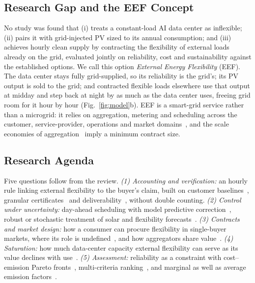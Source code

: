 \documentclass[conference]{IEEEtran}
\begin{document}
\subsection{Research Gap and the EEF Concept}
No study was found that (i) treats a constant-load AI data center as inflexible; (ii) pairs it with grid-injected PV sized to its annual consumption; and (iii) achieves hourly clean supply by contracting the flexibility of external loads already on the grid, evaluated jointly on reliability, cost and sustainability against the established options. We call this option \emph{External Energy Flexibility} (EEF). The data center stays fully grid-supplied, so its reliability is the grid's; its PV output is sold to the grid; and contracted flexible loads elsewhere use that output at midday and step back at night by as much as the data center uses, freeing grid room for it hour by hour (Fig.~\ref{fig:model}b). EEF is a smart-grid service rather than a microgrid: it relies on aggregation, metering and scheduling across the customer, service-provider, operations and market domains~\cite{r54}, and the scale economies of aggregation~\cite{r59} imply a minimum contract size.

\subsection{Research Agenda}
Five questions follow from the review. \emph{(1) Accounting and verification:} an hourly rule linking external flexibility to the buyer's claim, built on customer baselines~\cite{r45}, granular certificates~\cite{r51} and deliverability~\cite{r50}, without double counting. \emph{(2) Control under uncertainty:} day-ahead scheduling with model predictive correction~\cite{r60}, robust or stochastic treatment of solar and flexibility forecasts~\cite{r14,r16,r19}. \emph{(3) Contracts and market design:} how a consumer can procure flexibility in single-buyer markets, where its role is undefined~\cite{r23}, and how aggregators share value~\cite{r59}. \emph{(4) Saturation:} how much data-center capacity external flexibility can serve as its value declines with use~\cite{r23,r27,r44}. \emph{(5) Assessment:} reliability as a constraint with cost--emission Pareto fronts~\cite{r32,r39}, multi-criteria ranking~\cite{r36}, and marginal as well as average emission factors~\cite{r38,r46,r47}.
\end{document}
